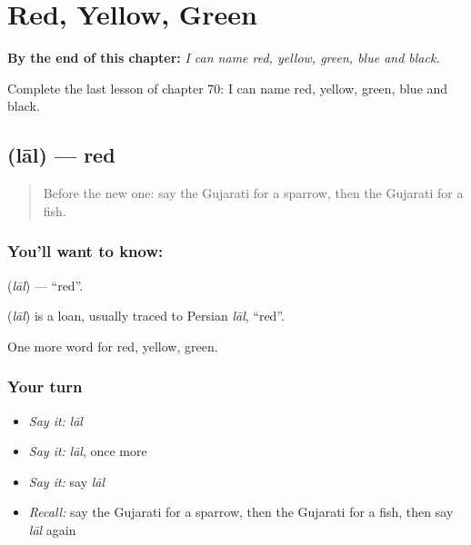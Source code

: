 
\chapter{Red, Yellow, Green}
\label{ch:gu-red-yellow-green}

\begin{chapteropening}
\textbf{By the end of this chapter:} \emph{I can name red, yellow, green, blue and black.}

Complete the last lesson of chapter 70: I can name red, yellow, green, blue and black.
\end{chapteropening}

\section[\texorpdfstring{\gu{લાલ} (lāl)}{લાલ (lāl)}]{ (lāl) — red}

\label{lesson:GU-C70-red}



\begin{quote}
Before the new one: say the Gujarati for a sparrow, then the Gujarati for a fish.
\end{quote}

\subsection*{You'll want to know: }
\textbf{} (\emph{lāl}) — \textquotedblleft{}red\textquotedblright{}.

\begin{cousinweb}
\textbf{} (\emph{lāl}) is a loan, usually traced to Persian \emph{lāl}, \textquotedblleft{}red\textquotedblright{}.
\end{cousinweb}

\begin{grammarlens}[title={What you've built}]
One more word for red, yellow, green.
\end{grammarlens}

\subsection*{Your turn}
\begin{itemize}
\raggedright
  \item \emph{Say it:} \emph{lāl}
  \item \emph{Say it:} \emph{lāl}, once more
  \item \emph{Say it:} say \emph{lāl}
  \item \emph{Recall:} say the Gujarati for a sparrow, then the Gujarati for a fish, then say \emph{lāl} again
\end{itemize}

